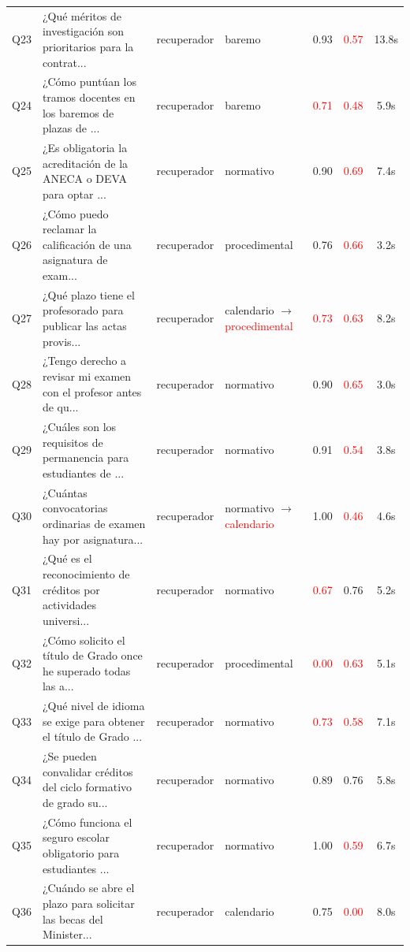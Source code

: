 \documentclass[12pt,a4paper,oneside]{report}
\begin{document}
\begin{longtable}{p{0.6cm} p{5.0cm} p{2.6cm} p{2.6cm} c c c}
Q23 & ¿Qué méritos de investigación son prioritarios para la contrat... & recuperador & baremo & 0.93 & \textcolor{red}{0.57} & 13.8s \\
Q24 & ¿Cómo puntúan los tramos docentes en los baremos de plazas de ... & recuperador & baremo & \textcolor{red}{0.71} & \textcolor{red}{0.48} & 5.9s \\
Q25 & ¿Es obligatoria la acreditación de la ANECA o DEVA para optar ... & recuperador & normativo & 0.90 & \textcolor{red}{0.69} & 7.4s \\
Q26 & ¿Cómo puedo reclamar la calificación de una asignatura de exam... & recuperador & procedimental & 0.76 & \textcolor{red}{0.66} & 3.2s \\
Q27 & ¿Qué plazo tiene el profesorado para publicar las actas provis... & recuperador & calendario $\rightarrow$ \textcolor{red}{procedimental} & \textcolor{red}{0.73} & \textcolor{red}{0.63} & 8.2s \\
Q28 & ¿Tengo derecho a revisar mi examen con el profesor antes de qu... & recuperador & normativo & 0.90 & \textcolor{red}{0.65} & 3.0s \\
Q29 & ¿Cuáles son los requisitos de permanencia para estudiantes de ... & recuperador & normativo & 0.91 & \textcolor{red}{0.54} & 3.8s \\
Q30 & ¿Cuántas convocatorias ordinarias de examen hay por asignatura... & recuperador & normativo $\rightarrow$ \textcolor{red}{calendario} & 1.00 & \textcolor{red}{0.46} & 4.6s \\
Q31 & ¿Qué es el reconocimiento de créditos por actividades universi... & recuperador & normativo & \textcolor{red}{0.67} & 0.76 & 5.2s \\
Q32 & ¿Cómo solicito el título de Grado once he superado todas las a... & recuperador & procedimental & \textcolor{red}{0.00} & \textcolor{red}{0.63} & 5.1s \\
Q33 & ¿Qué nivel de idioma se exige para obtener el título de Grado ... & recuperador & normativo & \textcolor{red}{0.73} & \textcolor{red}{0.58} & 7.1s \\
Q34 & ¿Se pueden convalidar créditos del ciclo formativo de grado su... & recuperador & normativo & 0.89 & 0.76 & 5.8s \\
Q35 & ¿Cómo funciona el seguro escolar obligatorio para estudiantes ... & recuperador & normativo & 1.00 & \textcolor{red}{0.59} & 6.7s \\
Q36 & ¿Cuándo se abre el plazo para solicitar las becas del Minister... & recuperador & calendario & 0.75 & \textcolor{red}{0.00} & 8.0s \\

\end{longtable}
\end{document}
